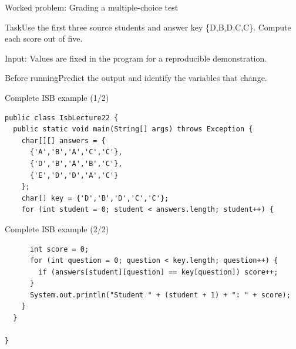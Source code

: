 \documentclass[10pt,aspectratio=169]{beamer}
\begin{document}
\begin{frame}[fragile,t]{Worked problem: Grading a multiple{-}choice test}
\begin{block}{Task}Use the first three source students and answer key \{D,B,D,C,C\}. Compute each score out of five.\end{block}
\small Input: Values are fixed in the program for a reproducible demonstration.\par\vspace{3mm}\begin{exampleblock}{Before running}Predict the output and identify the variables that change.\end{exampleblock}
\end{frame}

\begin{frame}[fragile,t]{Complete ISB example (1/2)}
\begin{lstlisting}
public class IsbLecture22 {
  public static void main(String[] args) throws Exception {
    char[][] answers = {
      {'A','B','A','C','C'},
      {'D','B','A','B','C'},
      {'E','D','D','A','C'}
    };
    char[] key = {'D','B','D','C','C'};
    for (int student = 0; student < answers.length; student++) {
\end{lstlisting}
\end{frame}

\begin{frame}[fragile,t]{Complete ISB example (2/2)}
\begin{lstlisting}
      int score = 0;
      for (int question = 0; question < key.length; question++) {
        if (answers[student][question] == key[question]) score++;
      }
      System.out.println("Student " + (student + 1) + ": " + score);
    }
  }

}
\end{lstlisting}
\end{frame}
\end{document}
